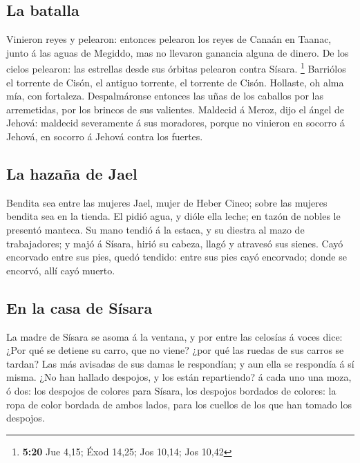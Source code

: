 \hypertarget{la-batalla}{%
\subsection{La batalla}\label{la-batalla}}

 Vinieron reyes y pelearon: entonces pelearon los reyes de
Canaán en Taanac, junto á las aguas de Megiddo, mas no llevaron ganancia
alguna de dinero.  De los cielos pelearon: las estrellas
desde sus órbitas pelearon contra Sísara. \footnote{\textbf{5:20} Jue
  4,15; Éxod 14,25; Jos 10,14; Jos 10,42}  Barriólos el
torrente de Cisón, el antiguo torrente, el torrente de Cisón. Hollaste,
oh alma mía, con fortaleza.  Despalmáronse entonces las
uñas de los caballos por las arremetidas, por los brincos de sus
valientes.  Maldecid á Meroz, dijo el ángel de Jehová:
maldecid severamente á sus moradores, porque no vinieron en socorro á
Jehová, en socorro á Jehová contra los fuertes.

\hypertarget{la-hazauxf1a-de-jael}{%
\subsection{La hazaña de Jael}\label{la-hazauxf1a-de-jael}}

 Bendita sea entre las mujeres Jael, mujer de Heber Cineo;
sobre las mujeres bendita sea en la tienda.  El pidió agua,
y dióle ella leche; en tazón de nobles le presentó manteca.
 Su mano tendió á la estaca, y su diestra al mazo de
trabajadores; y majó á Sísara, hirió su cabeza, llagó y atravesó sus
sienes.  Cayó encorvado entre sus pies, quedó tendido:
entre sus pies cayó encorvado; donde se encorvó, allí cayó muerto.

\hypertarget{en-la-casa-de-suxedsara}{%
\subsection{En la casa de Sísara}\label{en-la-casa-de-suxedsara}}

 La madre de Sísara se asoma á la ventana, y por entre las
celosías á voces dice: ¿Por qué se detiene su carro, que no viene? ¿por
qué las ruedas de sus carros se tardan?  Las más avisadas
de sus damas le respondían; y aun ella se respondía á sí misma.
 ¿No han hallado despojos, y los están repartiendo? á cada
uno una moza, ó dos: los despojos de colores para Sísara, los despojos
bordados de colores: la ropa de color bordada de ambos lados, para los
cuellos de los que han tomado los despojos.

